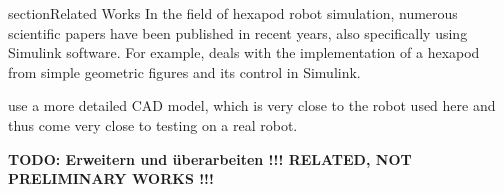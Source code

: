 %

section{Related Works}
In the field of hexapod robot simulation, numerous scientific papers have been published in recent years, also specifically using Simulink software.
For example, \parencite{HexapodRobotSimscapeMultibody} deals with the implementation of a hexapod from simple geometric figures and its control in Simulink.

\parencite{DynamicModelingAndControlMatlabSimMechanics} use a more detailed CAD model, which is very close to the robot used here and thus come very close to testing on a real robot.

%

\textbf{TODO: Erweitern und überarbeiten !!! RELATED, NOT PRELIMINARY WORKS !!!}


